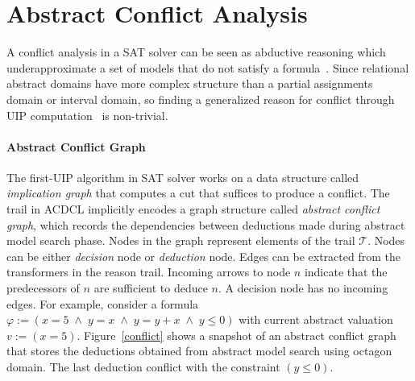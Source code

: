 \section{Abstract Conflict Analysis}
A conflict analysis in a SAT solver can be seen as abductive 
reasoning which underapproximate a set of models that do not satisfy a 
formula~\cite{sas12,dhk2013-popl}.  
Since relational abstract domains have more complex structure than a partial 
assignments domain or interval domain, so finding a generalized reason for 
conflict through UIP computation~\cite{uip} is non-trivial. 

\paragraph {\textbf{Abstract Conflict Graph}}
The first-UIP algorithm in SAT solver works on a data structure called 
{\em implication graph} that computes a cut that suffices to produce a 
conflict.  The trail in ACDCL implicitly encodes a graph structure called 
{\em abstract conflict graph}, which records the dependencies between 
deductions made during abstract model search phase.  Nodes in the graph 
represent elements of the trail $\mathcal{T}$.  Nodes can be either 
{\em decision} node or {\em deduction} node. Edges can be extracted from
the transformers in the reason trail.  Incoming arrows to node $n$ 
indicate that the predecessors of $n$ are sufficient to deduce $n$.  
A decision node has no incoming edges.  
For example, consider a formula 
$\varphi:= (x=5 \; \wedge \; y=x \; \wedge \; y=y+x \; \wedge \; y \leq 0)$ with current 
abstract valuation $v:= (x=5)$.  Figure~\ref{conflict} shows a 
snapshot of an abstract conflict graph that 
stores the deductions obtained from abstract model search using octagon domain.  
The last deduction conflict with the constraint $(y \leq 0)$.  

